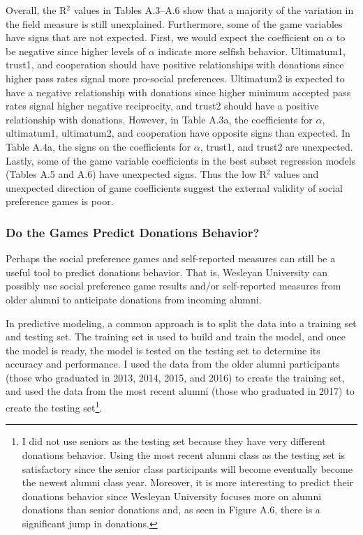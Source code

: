 \documentclass[12pt]{article}
\begin{document}
Overall, the R$^{2}$ values in Tables A.3--A.6 show that a majority of the variation in the field measure is still unexplained. Furthermore, some of the game variables have signs that are not expected. First, we would expect the coefficient on \(\alpha\) to be negative since higher levels of \(\alpha\) indicate more selfish behavior. Ultimatum1, trust1, and cooperation should have positive relationships with donations since higher pass rates signal more pro-social preferences. Ultimatum2 is expected to have a negative relationship with donations since higher minimum accepted pass rates signal higher negative reciprocity, and trust2 should have a positive relationship with donations. However, in Table A.3a, the coefficients for \(\alpha\), ultimatum1, ultimatum2, and cooperation have opposite signs than expected. In Table A.4a, the signs on the coefficients for \(\alpha\), trust1, and trust2 are unexpected. Lastly, some of the game variable coefficients in the best subset regression models (Tables A.5 and A.6) have unexpected signs. Thus the low R$^{2}$ values and unexpected direction of game coefficients suggest the external validity of social preference games is poor.


\subsubsection{Do the Games Predict Donations Behavior?}

Perhaps the social preference games and self-reported measures can still be a useful tool to predict donations behavior. That is, Wesleyan University can possibly use social preference game results and/or self-reported measures from older alumni to anticipate donations from incoming alumni.

In predictive modeling, a common approach is to split the data into a training set and testing set. The training set is used to build and train the model, and once the model is ready, the model is tested on the testing set to determine its accuracy and performance. I used the data from the older alumni participants (those who graduated in 2013, 2014, 2015, and 2016) to create the training set, and used the data from the most recent alumni (those who graduated in 2017) to create the testing set\footnote{I did not use seniors as the testing set because they have very different donations behavior. Using the most recent alumni class as the testing set is satisfactory since the senior class participants will become eventually become the newest alumni class year. Moreover, it is more interesting to predict their donations behavior since Wesleyan University focuses more on alumni donations than senior donations and, as seen in Figure A.6, there is a significant jump in donations.}. 
\end{document}
